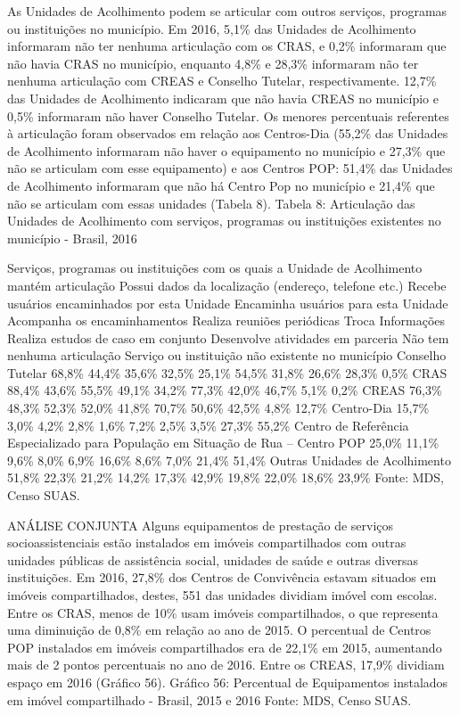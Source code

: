 \documentclass[
  brazilian]{report}
\begin{document}
As Unidades de Acolhimento podem se articular com outros serviços,
programas ou instituições no município. Em 2016, 5,1\% das Unidades de
Acolhimento informaram não ter nenhuma articulação com os CRAS, e 0,2\%
informaram que não havia CRAS no município, enquanto 4,8\% e 28,3\%
informaram não ter nenhuma articulação com CREAS e Conselho Tutelar,
respectivamente. 12,7\% das Unidades de Acolhimento indicaram que não
havia CREAS no município e 0,5\% informaram não haver Conselho Tutelar.
Os menores percentuais referentes à articulação foram observados em
relação aos Centros-Dia (55,2\% das Unidades de Acolhimento informaram
não haver o equipamento no município e 27,3\% que não se articulam com
esse equipamento) e aos Centros POP: 51,4\% das Unidades de Acolhimento
informaram que não há Centro Pop no município e 21,4\% que não se
articulam com essas unidades (Tabela 8). Tabela 8: Articulação das
Unidades de Acolhimento com serviços, programas ou instituições
existentes no município - Brasil, 2016

Serviços, programas ou instituições com os quais a Unidade de
Acolhimento mantém articulação Possui dados da localização (endereço,
telefone etc.) Recebe usuários encaminhados por esta Unidade Encaminha
usuários para esta Unidade Acompanha os encaminhamentos Realiza reuniões
periódicas Troca Informações Realiza estudos de caso em conjunto
Desenvolve atividades em parceria Não tem nenhuma articulação Serviço ou
instituição não existente no município Conselho Tutelar 68,8\% 44,4\%
35,6\% 32,5\% 25,1\% 54,5\% 31,8\% 26,6\% 28,3\% 0,5\% CRAS 88,4\%
43,6\% 55,5\% 49,1\% 34,2\% 77,3\% 42,0\% 46,7\% 5,1\% 0,2\% CREAS
76,3\% 48,3\% 52,3\% 52,0\% 41,8\% 70,7\% 50,6\% 42,5\% 4,8\% 12,7\%
Centro-Dia 15,7\% 3,0\% 4,2\% 2,8\% 1,6\% 7,2\% 2,5\% 3,5\% 27,3\%
55,2\% Centro de Referência Especializado para População em Situação de
Rua -- Centro POP 25,0\% 11,1\% 9,6\% 8,0\% 6,9\% 16,6\% 8,6\% 7,0\%
21,4\% 51,4\% Outras Unidades de Acolhimento 51,8\% 22,3\% 21,2\% 14,2\%
17,3\% 42,9\% 19,8\% 22,0\% 18,6\% 23,9\% Fonte: MDS, Censo SUAS.

ANÁLISE CONJUNTA Alguns equipamentos de prestação de serviços
socioassistenciais estão instalados em imóveis compartilhados com outras
unidades públicas de assistência social, unidades de saúde e outras
diversas instituições. Em 2016, 27,8\% dos Centros de Convivência
estavam situados em imóveis compartilhados, destes, 551 das unidades
dividiam imóvel com escolas. Entre os CRAS, menos de 10\% usam imóveis
compartilhados, o que representa uma diminuição de 0,8\% em relação ao
ano de 2015. O percentual de Centros POP instalados em imóveis
compartilhados era de 22,1\% em 2015, aumentando mais de 2 pontos
percentuais no ano de 2016. Entre os CREAS, 17,9\% dividiam espaço em
2016 (Gráfico 56). Gráfico 56: Percentual de Equipamentos instalados em
imóvel compartilhado - Brasil, 2015 e 2016 Fonte: MDS, Censo SUAS.
\end{document}
